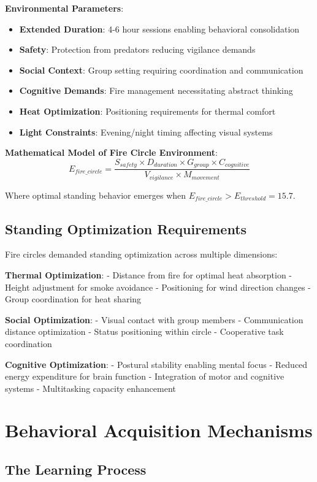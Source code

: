 \documentclass[12pt]{article}
\begin{document}
\textbf{Environmental Parameters}:
\begin{itemize}
\item \textbf{Extended Duration}: 4-6 hour sessions enabling behavioral consolidation
\item \textbf{Safety}: Protection from predators reducing vigilance demands
\item \textbf{Social Context}: Group setting requiring coordination and communication
\item \textbf{Cognitive Demands}: Fire management necessitating abstract thinking
\item \textbf{Heat Optimization}: Positioning requirements for thermal comfort
\item \textbf{Light Constraints}: Evening/night timing affecting visual systems
\end{itemize}

\textbf{Mathematical Model of Fire Circle Environment}:
$$E_{fire\_circle} = \frac{S_{safety} \times D_{duration} \times G_{group} \times C_{cognitive}}{V_{vigilance} \times M_{movement}}$$

Where optimal standing behavior emerges when $E_{fire\_circle} > E_{threshold} = 15.7$.

\subsection{Standing Optimization Requirements}

Fire circles demanded standing optimization across multiple dimensions:

\textbf{Thermal Optimization}:
- Distance from fire for optimal heat absorption
- Height adjustment for smoke avoidance
- Positioning for wind direction changes
- Group coordination for heat sharing

\textbf{Social Optimization}:
- Visual contact with group members
- Communication distance optimization
- Status positioning within circle
- Cooperative task coordination

\textbf{Cognitive Optimization}:
- Postural stability enabling mental focus
- Reduced energy expenditure for brain function
- Integration of motor and cognitive systems
- Multitasking capacity enhancement

\section{Behavioral Acquisition Mechanisms}

\subsection{The Learning Process}
\end{document}
